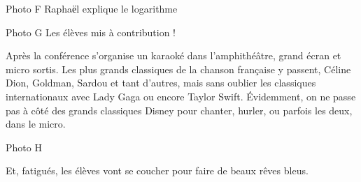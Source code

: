 Photo F
Raphaёl explique le logarithme

Photo G
Les élèves mis à contribution !

Après la conférence s’organise un karaoké dans l’amphithéâtre, grand écran et micro sortis. Les plus grands classiques de la chanson française y passent, Céline Dion, Goldman, Sardou et tant d’autres, mais sans oublier les classiques internationaux avec Lady Gaga ou encore Taylor Swift. Évidemment, on ne passe pas à côté des grands classiques Disney pour chanter, hurler, ou parfois les deux, dans le micro.

Photo H

Et, fatigués, les élèves vont se coucher pour faire de beaux rêves bleus.

